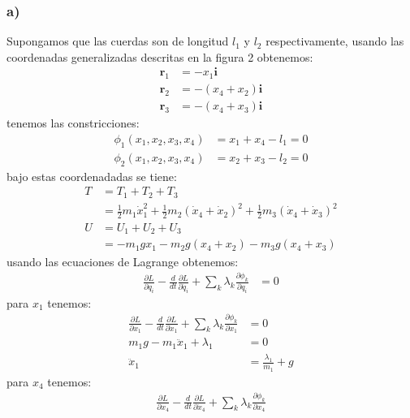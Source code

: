 \documentclass{article}
\begin{document}
\begin{tcolorbox}[breakable]
    \subsubsection*{a)}
    Supongamos que las cuerdas son de longitud $l_1$ y $l_2$ respectivamente, usando las coordenadas generalizadas
    descritas en la figura 2 obtenemos:
    \begin{align*}
        \bm{r}_1 &= -x_1 \bm{i} \\
        \bm{r}_2 &= -(x_4+x_2) \bm{i} \\
        \bm{r}_3 &= -(x_4+x_3)\bm{i}
    \end{align*}
    tenemos las constricciones:
    \begin{align*}
        \phi_1(x_1,x_2,x_3,x_4) &= x_1 + x_4 - l_1 = 0 \\
        \phi_2(x_1,x_2,x_3,x_4) &= x_2 + x_3 - l_2 = 0 
    \end{align*}
    bajo estas coordenadadas se tiene:
    \begin{align*}
        T
        &= T_1 + T_2 + T_3 \\
        &=\frac{1}{2}m_1\dot{x}_1^2 
        + \frac{1}{2}m_2(\dot{x}_4 + \dot{x}_2)^2
        + \frac{1}{2}m_3(\dot{x}_4 + \dot{x}_3)^2 \\
        U 
        &= U_1 + U_2 + U_3 \\
        &= -m_1gx_1-m_2g(x_4+x_2)-m_3g(x_4+x_3)
    \end{align*}
    usando las ecuaciones de Lagrange obtenemos:
    \begin{align*}
        \frac{\partial L}{\partial q_i} 
        -\frac{d}{dt}\frac{\partial L}{\partial \dot{q}_i} 
        + \sum_k \lambda_k \frac{\partial \phi_k}{\partial q_i}
        &= 0  
    \end{align*}
    para $x_1$ tenemos:
    \begin{align*}
        \frac{\partial L}{\partial x_1} 
        -\frac{d}{dt}\frac{\partial L}{\partial \dot{x}_1} 
        + \sum_k \lambda_k \frac{\partial \phi_k}{\partial x_1}
        &= 0  \\
        m_1g - m_1\ddot{x}_1 + \lambda_1 &= 0 \\
        \ddot{x}_1 &= \frac{\lambda_1}{m_1} + g
    \end{align*}
    para $x_4$ tenemos:
    \begin{align*}
        \frac{\partial L}{\partial x_4} 
        -\frac{d}{dt}\frac{\partial L}{\partial \dot{x}_4} 
        + \sum_k \lambda_k \frac{\partial \phi_k}{\partial x_4}

\end{align*}
\end{tcolorbox}
\end{document}
